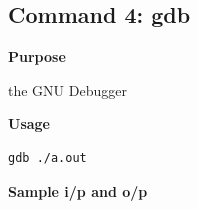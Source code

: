 \subsection{Command 4: gdb} 
\textbf{Purpose}
\begin{flushleft}
the GNU Debugger
\end{flushleft}
\textbf{Usage}
\begin{verbatim}
gdb ./a.out
\end{verbatim}
\textbf{Sample i/p and o/p}
\begin{figure}[H] 
\end{figure}
